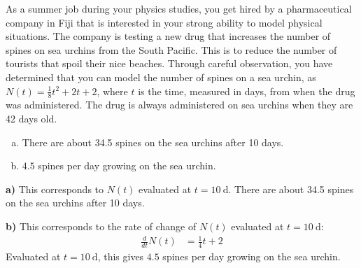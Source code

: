 \question As a summer job during your physics studies, you get hired by a pharmaceutical company in Fiji that is interested in your strong ability to model physical situations. The company is testing a new drug that increases the number of spines on sea urchins from the South Pacific. This is to reduce the number of tourists that spoil their nice beaches. Through careful observation, you have determined that you can model the number of spines on a sea urchin, as $N(t) = \frac{1}{8}t^2+2t+2$, where $t$ is the time, measured in days, from when the drug was administered. The drug is always administered on sea urchins when they are 42 days old.
\begin{finalanswer}
\begin{enumerate}[(a)]
\item There are about 34.5 spines on the sea urchins after 10 days.
\item  $4.5$ spines per day growing on the sea urchin.
\end{enumerate}
\end{finalanswer}
\begin{solution}
\textbf{a)} This corresponds to $N(t)$ evaluated at $t=\SI{10}{\day}$. There are about 34.5 spines on the sea urchins after 10 days.

\textbf{b)} This corresponds to the rate of change of $N(t)$ evaluated at $t=\SI{10}{\day}$:
\begin{align*}
\frac{d}{dt}N(t) &= \frac{1}{4}t+2
\end{align*}
Evaluated at $t=\SI{10}{\day}$, this gives $4.5$ spines per day growing on the sea urchin.
\end{solution}



